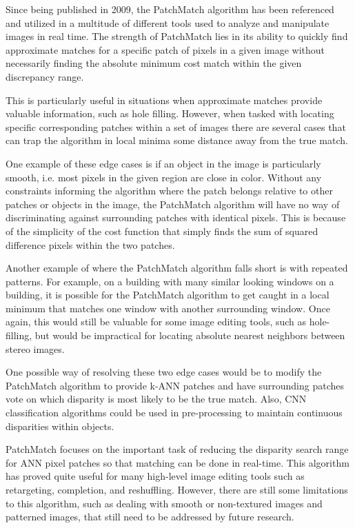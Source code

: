 \documentclass{article}
\begin{document}
Since being published in 2009, the PatchMatch \citep{barnes2009patchmatch} algorithm has been referenced and utilized in a multitude of different tools used to analyze and manipulate images in real time. The strength of PatchMatch lies in its ability to quickly find approximate matches for a specific patch of pixels in a given image without necessarily finding the absolute minimum cost match within the given discrepancy range.

This is particularly useful in situations when approximate matches provide valuable information, such as hole filling. However, when tasked with locating specific corresponding patches within a set of images there are several cases that can trap the algorithm in local minima some distance away from the true match.

One example of these edge cases is if an object in the image is particularly smooth, i.e. most pixels in the given region are close in color. Without any constraints informing the algorithm where the patch belongs relative to other patches or objects in the image, the PatchMatch algorithm \citep{barnes2009patchmatch} will have no way of discriminating against surrounding patches with identical pixels. This is because of the simplicity of the cost function that simply finds the sum of squared difference pixels within the two patches.

Another example of where the PatchMatch \citep{barnes2009patchmatch} algorithm falls short is with repeated patterns. For example, on a building with many similar looking windows on a building, it is possible for the PatchMatch algorithm to get caught in a local minimum that matches one window with another surrounding window. Once again, this would still be valuable for some image editing tools, such as hole-filling, but would be impractical for locating absolute nearest neighbors between stereo images.

One possible way of resolving these two edge cases would be to modify the PatchMatch \citep{barnes2009patchmatch} algorithm to provide k-ANN patches and have surrounding patches vote on which disparity is most likely to be the true match. Also, CNN classification algorithms could be used in pre-processing to maintain continuous disparities within objects.

PatchMatch \citep{barnes2009patchmatch} focuses on the important task of reducing the disparity search range for ANN pixel patches so that matching can be done in real-time. This algorithm has proved quite useful for many high-level image editing tools such as retargeting, completion, and reshuffling. However, there are still some limitations to this algorithm, such as dealing with smooth or non-textured images and patterned images, that still need to be addressed by future research.
\end{document}
